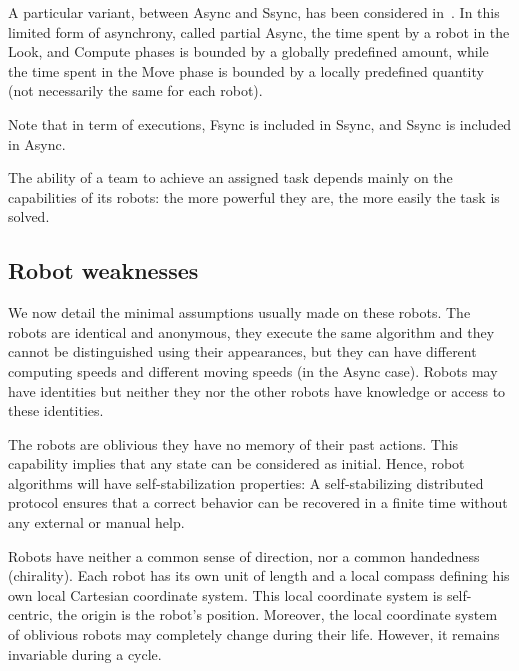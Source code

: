 A particular variant, between Async and Ssync, has been considered in~\cite{LinMA07a}. In this limited form of asynchrony, called partial Async, the time spent by a robot in the Look, and Compute phases is bounded by a globally predefined amount, while the time spent in the Move phase is bounded by a locally predefined quantity (not necessarily the same for each robot). 

Note that  in term of executions, Fsync is included in Ssync, and Ssync is included in Async.

\bigskip
The ability of a team to achieve an assigned task depends mainly on the capabilities of its robots:  the more powerful they are, 
the more easily the task is solved. %
 
\subsection{Robot weaknesses}
We now detail the minimal assumptions usually made on these robots.
The robots are identical and anonymous, they execute the same algorithm and they cannot be distinguished using their appearances, but they can have different computing speeds and different moving speeds (in the Async case). Robots may have identities but neither they nor the other robots have knowledge or access to these identities. 

The robots are oblivious \ie they have no memory of their past actions. 
This capability implies that any state can be considered as initial. Hence, robot algorithms will have self-stabilization properties: 
A self-stabilizing distributed protocol ensures that a correct behavior can be recovered in a finite time without any external or manual help.

Robots  have neither a common sense of direction, nor a common handedness (chirality).
Each robot has its own unit of length and a local compass defining his own local Cartesian coordinate system. This local coordinate system is self-centric, \ie the origin is the robot's position. Moreover, the local coordinate system of oblivious robots may completely change during their life. However, it remains invariable during a cycle.

